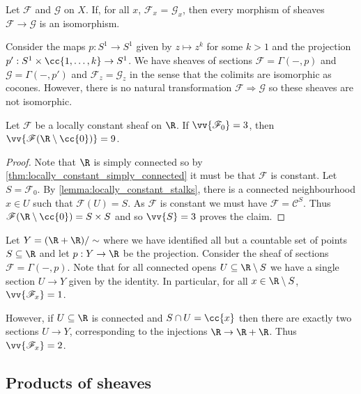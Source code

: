 \documentclass{article}
\begin{document}
\begin{theorem}
  Let $\mathscr F$ and $\mathscr G$ on $X$. If, for all $x$,
  $\mathscr F_x$ = $\mathscr G_x$, then every morphism of sheaves
  $\mathscr F\to\mathscr G$ is an isomorphism.
\end{theorem}

\begin{example}
  Consider the maps $p:S^1\to S^1$ given by $z\mapsto z^k$ for some $k>1$
  and the projection $p':S^1\times\cc{1,\ldots,k}\to S^1$. We have sheaves
  of sections $\mathscr F=\Gamma(-,p)$ and $\mathscr G=\Gamma(-,p')$
  and $\mathscr F_z=\mathscr G_z$ in the sense that the colimits are
  isomorphic as cocones. However, there is no natural transformation
  $\mathscr F\Rightarrow\mathscr G$ so these sheaves are not isomorphic.
\end{example}

\begin{example}
  Let $\mathscr F$ be a locally constant sheaf on $\R$. If
  $\vv{\mathscr F_0}=3$, then $\vv{\mathscr F(\R\setminus\cc{0})}=9$.
  \begin{proof}
    Note that $\R$ is simply connected so by
    \ref{thm:locally_constant_simply_connected} it must be that $\mathscr F$ is
    constant. Let $S=\mathscr F_0$. By \ref{lemma:locally_constant_stalks},
    there is a connected neighbourhood $x\in U$ such that
    $\mathscr F(U) = S$. As $\mathscr F$ is constant we must have
    $\mathscr F = \mathscr C^S$. Thus
    $\mathscr F(\R\setminus\cc{0}) = S\times S$ and so
    $\vv{S}=3$ proves the claim.
  \end{proof}
\end{example}

\begin{example}
  Let $Y=(\R+\R)/\sim$ where we have identified all but a countable set of points
  $S\subseteq\R$ and let $p:Y\to\R$ be the projection. Consider the sheaf of
  sections $\mathscr F = \Gamma(-,p)$.
  Note that for all connected opens $U\subseteq\R\setminus S$
  we have a single section $U\to Y$ given by the identity. In particular,
  for all $x\in\R\setminus S$, $\vv{\mathscr F_x} = 1$.

  However, if $U\subseteq\R$ is connected and $S\cap U = \cc{x}$
  then there are exactly two sections $U\to Y$, corresponding
  to the injections $\R\to\R + \R$. Thus $\vv{\mathscr F_x}=2$.
\end{example}

\subsection{Products of sheaves}
\end{document}
